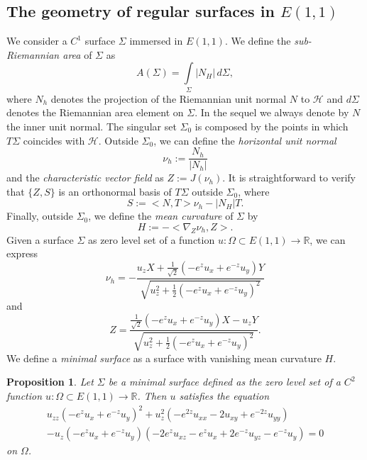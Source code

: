 \documentclass[10pt]{amsart}
\newtheorem{proposition}[theorem]{Proposition}
\theoremstyle{definition}
\theoremstyle{remark}
\numberwithin{equation}{section}
\begin{document}
\subsection{The geometry of regular surfaces in $E(1,1)$}
We consider a $C^1$ surface ${\Sigma}$ immersed in $E(1,1)$. We define the \emph{sub-Riemannian area} of ${\Sigma}$ as
\[
{A}({\Sigma})=\int\limits_{\Sigma}{|N_{H}|}\, d{\Sigma},
\]
where $N_h$ denotes the projection of the Riemannian unit normal $N$ to ${\mathcal{H}}$ and $d{\Sigma}$ denotes the Riemannian area element on ${\Sigma}$. In the sequel we always denote by $N$ the inner unit normal. The singular set ${\Sigma}_0$ is composed by the points in which $T{\Sigma}$ coincides with ${\mathcal{H}}$. Outside ${\Sigma}_0$, we can define the \emph{horizontal unit normal} 
\[
\nu_h:=\frac{N_h}{|N_h|}
\]
and the \emph{characteristic vector field} as $Z:=J(\nu_h)$. It is straightforward to verify that $\{Z,S\}$ is an orthonormal basis of $T{\Sigma}$ outside ${\Sigma}_0$, where
\[
S:={{\big<{N,T}\big>}} \nu_h-{|N_{H}|} T.
\]
Finally, outside ${\Sigma}_0$, we define the \emph{mean curvature} of ${\Sigma}$ by
\begin{equation}\label{def:H}
H:=-{\big<{{\nabla}_Z \nu_h,Z}\big>}.
\end{equation}
Given a surface ${\Sigma}$ as zero level set of a function $u:\Omega\subset {E(1,1)}\rightarrow {{\mathbb{R}}}$, we can express
\begin{equation}\label{eq:nuhexpression}
\nu_h=-\frac{u_z X+\frac{1}{\sqrt{2}}(-e^z u_x+e^{-z}u_y)Y}{\sqrt{u_z^2+\frac{1}{2}(-e^z u_x+e^{-z}u_y)^2}}
\end{equation}
and
\begin{equation}\label{eq:Zexpression}
Z=\frac{\frac{1}{\sqrt{2}}(-e^z u_x+e^{-z}u_y) X-u_z Y}{\sqrt{u_z^2+\frac{1}{2}(-e^z u_x+e^{-z}u_y)^2}}. 
\end{equation}
We define a \emph{minimal surface} as a surface with vanishing mean curvature $H$. 

\begin{proposition} Let ${\Sigma}$ be a minimal surface defined as the zero level set of a $C^2$ function $u:\Omega\subset{E(1,1)} \rightarrow {{\mathbb{R}}}$. Then $u$ satisfies the equation
\begin{equation}\label{eq:minimalsurface}
\begin{split}
u_{zz}(-e^z u_x+e^{-z}u_y)^2+u_z^2 (-e^{2z}u_{xx}-2u_{xy}+e^{-2z}u_{yy})\\
-u_z (-e^z u_x+e^{-z}u_y) (-2e^z u_{xz}-e^z u_x +2e^{-z}u_{yz}-e^{-z}u_y)=0
\end{split}
\end{equation}
 on $\Omega$.
\end{proposition}
\end{document}
